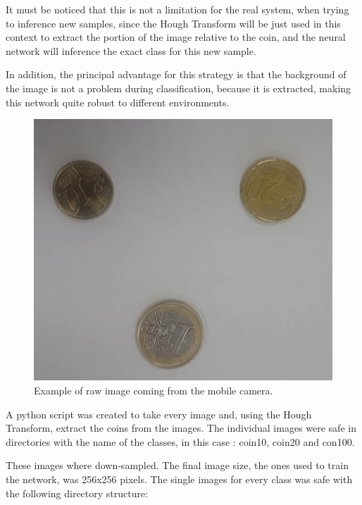 \documentclass[10pt,journal,compsoc]{IEEEtran}
\begin{document}
It must be noticed that this is not a limitation for the real system, when trying to inference new samples, since the Hough Transform will be just used in this context to extract the portion of the image relative to the coin, and the neural network will inference the exact class for this new sample. 

In addition, the principal advantage for this strategy is that the background of the image is not a problem during classification, because it is extracted, making this network quite robust to different environments.


\begin{figure}[h]
\centering
\includegraphics[scale=0.10]{inference-raw}
\caption{Example of raw image coming from the mobile camera.}
\label{fig:figure1}
\end{figure}

A python script was created to take every image and, using the Hough Transform, extract the coins from the images. The individual images were safe in directories with the name of the classes, in this case : coin10, coin20 and con100.

These images where down-sampled. The final image size, the ones used to train the network, was 256x256 pixels. The single images for every class was safe with the following directory structure:

\end{document}
